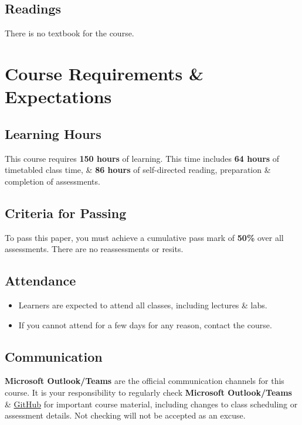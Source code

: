 \documentclass{article}
\begin{document}
\subsection*{Readings}
There is no textbook for the course.

\section*{Course Requirements \& Expectations}

\subsection*{Learning Hours}
This course requires \textbf{150 hours} of learning. This time includes \textbf{64 hours} of timetabled class time, \& \textbf{86 hours} of self-directed reading, preparation \& completion of assessments.

\subsection*{Criteria for Passing}
To pass this paper, you must achieve a cumulative pass mark of \textbf{50\%} over all assessments. There are no reassessments or resits.

\subsection*{Attendance}
\begin{itemize}
	\item Learners are expected to attend all classes, including lectures \& labs.
	\item If you cannot attend for a few days for any reason, contact the course.
\end{itemize}

\subsection*{Communication}
\textbf{Microsoft Outlook/Teams} are the official communication channels for this course. It is your responsibility to regularly check \textbf{Microsoft Outlook/Teams} \& \href{https://github.com/otago-polytechnic-bit-courses/IN607-intro-app-dev-concepts}{GitHub} for important course material, including changes to class scheduling or assessment details. Not checking will not be accepted as an excuse.
\end{document}
